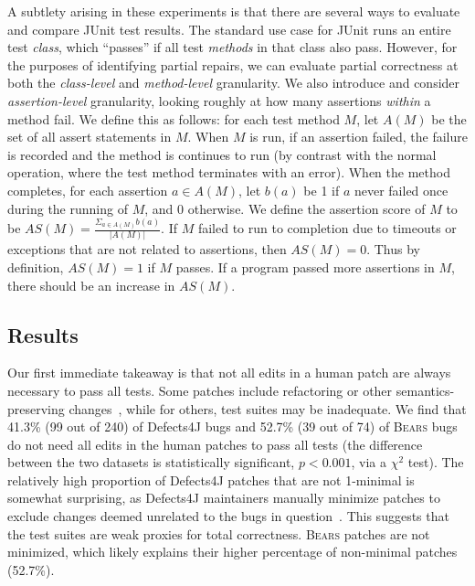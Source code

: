 \documentclass[10pt, conference]{IEEEtran}
\newcommand\bears{\textsc{Bears}\xspace}
\begin{document}
A subtlety arising in these experiments is that there are several ways to
evaluate and compare JUnit test results.  The standard use case for JUnit runs
an entire test \emph{class}, which ``passes'' if all test \emph{methods} in
that class also pass.  However, for the purposes of identifying partial repairs,
we can evaluate partial correctness at both the \emph{class-level} and
\emph{method-level} granularity. 
We also introduce and consider \emph{assertion-level} granularity, looking
roughly at how many assertions \emph{within} a method fail.  We define this as follows:
for each test method $M$, let $A(M)$ be the set of all assert statements in $M$. 
When $M$ is run, if an assertion failed, the failure is recorded and the method 
is continues to run (by contrast with the normal operation, where the test
method terminates with an error).  When the method completes, for each assertion
$a\in A(M)$, let $b(a)$ be 1 if $a$ never failed once during the running of $M$, 
and 0 otherwise. We define the assertion score of $M$ to be 
$AS(M)=\frac{\Sigma_{a\in A(M)}b(a)}{|A(M)|}$. If $M$ failed to run to completion 
due to timeouts or exceptions that are not related to assertions, then
$AS(M)=0$. Thus by definition, $AS(M)=1$ if $M$ passes. If a program passed more 
assertions in $M$, there should be an increase in $AS(M)$.


\subsection{Results}

Our first immediate takeaway is that not all edits
in a human patch are always necessary to pass all tests. 
Some patches 
include refactoring or other semantics-preserving changes~\cite{api-refactoring,
  tangledchanges}, while for others, test suites may be inadequate. 
We find that 41.3\%  (99 out of 240) of Defects4J bugs and 52.7\% (39 out of 74) of
\bears bugs do not need all edits in the human patches
to pass all tests (the difference between the two datasets is statistically
significant, $p < 0.001$, via a 
$\chi^2$ test). 
The relatively high proportion of Defects4J patches that are not 1-minimal is
somewhat surprising, as Defects4J maintainers manually minimize patches to exclude
changes deemed unrelated to the bugs in question~\cite{documentation-maybe}.
This suggests that the test suites are weak proxies for total correctness.
\bears patches are not minimized, which likely explains
their higher percentage of non-minimal patches (52.7\%).
\end{document}
